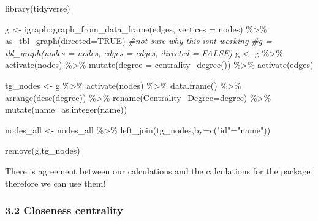 \documentclass[
]{article}
\newenvironment{Shaded}{\begin{snugshade}}{\end{snugshade}}
\newcommand{\AttributeTok}[1]{\textcolor[rgb]{0.77,0.63,0.00}{#1}}
\newcommand{\CommentTok}[1]{\textcolor[rgb]{0.56,0.35,0.01}{\textit{#1}}}
\newcommand{\ConstantTok}[1]{\textcolor[rgb]{0.00,0.00,0.00}{#1}}
\newcommand{\FunctionTok}[1]{\textcolor[rgb]{0.00,0.00,0.00}{#1}}
\newcommand{\NormalTok}[1]{#1}
\newcommand{\OtherTok}[1]{\textcolor[rgb]{0.56,0.35,0.01}{#1}}
\newcommand{\SpecialCharTok}[1]{\textcolor[rgb]{0.00,0.00,0.00}{#1}}
\newcommand{\StringTok}[1]{\textcolor[rgb]{0.31,0.60,0.02}{#1}}
\begin{document}
\begin{Shaded}
\begin{Highlighting}[]
\FunctionTok{library}\NormalTok{(tidyverse)}

\NormalTok{g }\OtherTok{\textless{}{-}}\NormalTok{ igraph}\SpecialCharTok{::}\FunctionTok{graph\_from\_data\_frame}\NormalTok{(edges, }\AttributeTok{vertices =}\NormalTok{ nodes) }\SpecialCharTok{\%\textgreater{}\%} \FunctionTok{as\_tbl\_graph}\NormalTok{(}\AttributeTok{directed=}\ConstantTok{TRUE}\NormalTok{)}
\CommentTok{\#not sure why this isnt working}
\CommentTok{\#g = tbl\_graph(nodes = nodes, edges = edges, directed = FALSE)}
\NormalTok{g }\OtherTok{\textless{}{-}}\NormalTok{ g }\SpecialCharTok{\%\textgreater{}\%} 
  \FunctionTok{activate}\NormalTok{(nodes) }\SpecialCharTok{\%\textgreater{}\%} 
  \FunctionTok{mutate}\NormalTok{(}\AttributeTok{degree =} \FunctionTok{centrality\_degree}\NormalTok{()) }\SpecialCharTok{\%\textgreater{}\%} 
  \FunctionTok{activate}\NormalTok{(edges)}

\NormalTok{tg\_nodes }\OtherTok{\textless{}{-}}
\NormalTok{  g }\SpecialCharTok{\%\textgreater{}\%}
  \FunctionTok{activate}\NormalTok{(nodes) }\SpecialCharTok{\%\textgreater{}\%}
  \FunctionTok{data.frame}\NormalTok{() }\SpecialCharTok{\%\textgreater{}\%}
  \FunctionTok{arrange}\NormalTok{(}\FunctionTok{desc}\NormalTok{(degree)) }\SpecialCharTok{\%\textgreater{}\%}
  \FunctionTok{rename}\NormalTok{(}\AttributeTok{Centrality\_Degree=}\NormalTok{degree) }\SpecialCharTok{\%\textgreater{}\%}
  \FunctionTok{mutate}\NormalTok{(}\AttributeTok{name=}\FunctionTok{as.integer}\NormalTok{(name))}

\NormalTok{nodes\_all }\OtherTok{\textless{}{-}}\NormalTok{ nodes\_all }\SpecialCharTok{\%\textgreater{}\%}
  \FunctionTok{left\_join}\NormalTok{(tg\_nodes,}\AttributeTok{by=}\FunctionTok{c}\NormalTok{(}\StringTok{"id"}\OtherTok{=}\StringTok{"name"}\NormalTok{)) }

\FunctionTok{remove}\NormalTok{(g,tg\_nodes)}
\end{Highlighting}
\end{Shaded}

There is agreement between our calculations and the calculations for the
package therefore we can use them!

\hypertarget{closeness-centrality}{%
\subsubsection{3.2 Closeness centrality}\label{closeness-centrality}}
\end{document}
